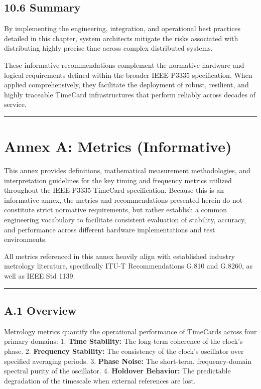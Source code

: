 \subsection{10.6 Summary}\label{summary-2}

By implementing the engineering, integration, and operational best
practices detailed in this chapter, system architects mitigate the risks
associated with distributing highly precise time across complex
distributed systems.

These informative recommendations complement the normative hardware and
logical requirements defined within the broader IEEE P3335
specification. When applied comprehensively, they facilitate the
deployment of robust, resilient, and highly traceable TimeCard
infrastructures that perform reliably across decades of service.

\begin{center}\rule{0.5\linewidth}{0.5pt}\end{center}

\section{Annex A: Metrics
(Informative)}\label{annex-a-metrics-informative}

This annex provides definitions, mathematical measurement methodologies,
and interpretation guidelines for the key timing and frequency metrics
utilized throughout the IEEE P3335 TimeCard specification. Because this
is an informative annex, the metrics and recommendations presented
herein do not constitute strict normative requirements, but rather
establish a common engineering vocabulary to facilitate consistent
evaluation of stability, accuracy, and performance across different
hardware implementations and test environments.

All metrics referenced in this annex heavily align with established
industry metrology literature, specifically ITU-T Recommendations G.810
and G.8260, as well as IEEE Std 1139.

\begin{center}\rule{0.5\linewidth}{0.5pt}\end{center}

\subsection{A.1 Overview}\label{a.1-overview}

Metrology metrics quantify the operational performance of TimeCards
across four primary domains: 1. \textbf{Time Stability:} The long-term
coherence of the clock's phase. 2. \textbf{Frequency Stability:} The
consistency of the clock's oscillator over specified averaging periods.
3. \textbf{Phase Noise:} The short-term, frequency-domain spectral
purity of the oscillator. 4. \textbf{Holdover Behavior:} The predictable
degradation of the timescale when external references are lost.

